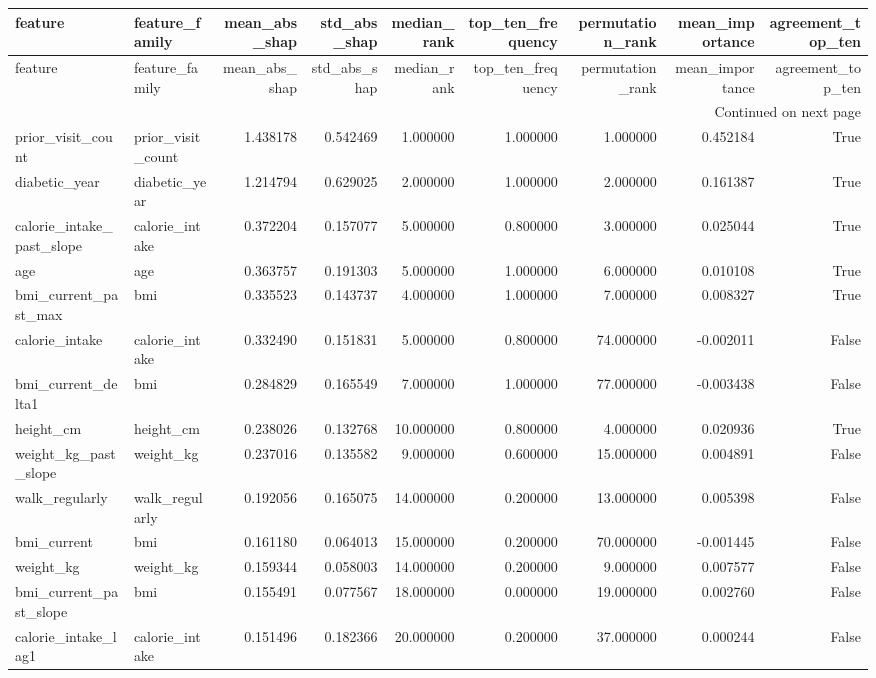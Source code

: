 \begin{longtable}{llrrrrrrr}
\toprule
feature & feature\_family & mean\_abs\_shap & std\_abs\_shap & median\_rank & top\_ten\_frequency & permutation\_rank & mean\_importance & agreement\_top\_ten \\
\midrule
\endfirsthead
\toprule
feature & feature\_family & mean\_abs\_shap & std\_abs\_shap & median\_rank & top\_ten\_frequency & permutation\_rank & mean\_importance & agreement\_top\_ten \\
\midrule
\endhead
\midrule
\multicolumn{9}{r}{Continued on next page} \\
\midrule
\endfoot
\bottomrule
\endlastfoot
prior\_visit\_count & prior\_visit\_count & 1.438178 & 0.542469 & 1.000000 & 1.000000 & 1.000000 & 0.452184 & True \\
diabetic\_year & diabetic\_year & 1.214794 & 0.629025 & 2.000000 & 1.000000 & 2.000000 & 0.161387 & True \\
calorie\_intake\_past\_slope & calorie\_intake & 0.372204 & 0.157077 & 5.000000 & 0.800000 & 3.000000 & 0.025044 & True \\
age & age & 0.363757 & 0.191303 & 5.000000 & 1.000000 & 6.000000 & 0.010108 & True \\
bmi\_current\_past\_max & bmi & 0.335523 & 0.143737 & 4.000000 & 1.000000 & 7.000000 & 0.008327 & True \\
calorie\_intake & calorie\_intake & 0.332490 & 0.151831 & 5.000000 & 0.800000 & 74.000000 & -0.002011 & False \\
bmi\_current\_delta1 & bmi & 0.284829 & 0.165549 & 7.000000 & 1.000000 & 77.000000 & -0.003438 & False \\
height\_cm & height\_cm & 0.238026 & 0.132768 & 10.000000 & 0.800000 & 4.000000 & 0.020936 & True \\
weight\_kg\_past\_slope & weight\_kg & 0.237016 & 0.135582 & 9.000000 & 0.600000 & 15.000000 & 0.004891 & False \\
walk\_regularly & walk\_regularly & 0.192056 & 0.165075 & 14.000000 & 0.200000 & 13.000000 & 0.005398 & False \\
bmi\_current & bmi & 0.161180 & 0.064013 & 15.000000 & 0.200000 & 70.000000 & -0.001445 & False \\
weight\_kg & weight\_kg & 0.159344 & 0.058003 & 14.000000 & 0.200000 & 9.000000 & 0.007577 & False \\
bmi\_current\_past\_slope & bmi & 0.155491 & 0.077567 & 18.000000 & 0.000000 & 19.000000 & 0.002760 & False \\
calorie\_intake\_lag1 & calorie\_intake & 0.151496 & 0.182366 & 20.000000 & 0.200000 & 37.000000 & 0.000244 & False \\

\end{longtable}
